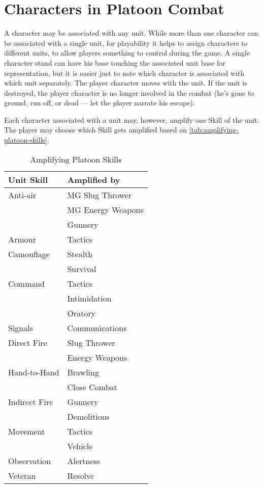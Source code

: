 \section{Characters in Platoon Combat}\label{sec:characters-in-platoon-combat}

A character may be associated with any unit. While more than one character can be associated with a single unit, for playability it helps to assign characters to different units, to allow players something to control during the game. A single character stand can have his base touching the associated unit base for representation, but it is easier just to note which character is associated with which unit separately. The player character moves with the unit. If the unit is destroyed, the player character is no longer involved in the combat (he's gone to ground, run off, or dead --- let the player narrate his escape).

Each character associated with a unit may, however, amplify one Skill of the unit. The player may choose which Skill gets amplified based on \autoref{tab:amplifying-platoon-skills}.

\begin{table}[ht]
\centering
\begin{tabular}{ll}
\toprule
Unit Skill	& Amplified by \\
\midrule
Anti-air	& MG Slug Thrower \\
{}		& MG Energy Weapons \\
{}		& Gunnery \\
Armour		& Tactics \\
Camouflage	& Stealth \\
{}		& Survival \\
Command		& Tactics \\
{}		& Intimidation \\
{}		& Oratory \\
Signals		& Communications \\
Direct Fire	& Slug Thrower \\
{}		& Energy Weapons \\
Hand-to-Hand	& Brawling \\
{}		& Close Combat \\
Indirect Fire	& Gunnery \\
{}		& Demolitions \\
Movement	& Tactics \\
{}		& Vehicle \\
Observation	& Alertness \\
Veteran		& Resolve \\
\bottomrule
\end{tabular}
\caption{Amplifying Platoon Skills}
\label{tab:amplifying-platoon-skills}
\end{table}

